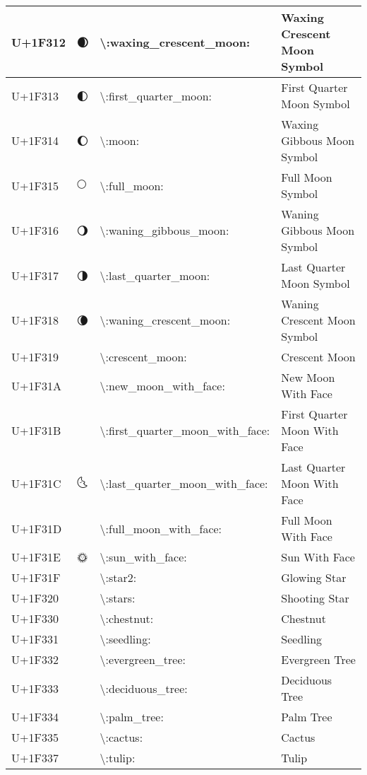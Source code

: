 \begin{table}[h]
\begin{tabulary}{\linewidth}{|L|L|L|L|}
\hline
U+1F312 & 🌒 & {\textbackslash}:waxing\_crescent\_moon: & Waxing Crescent Moon Symbol \\
\hline
U+1F313 & 🌓 & {\textbackslash}:first\_quarter\_moon: & First Quarter Moon Symbol \\
\hline
U+1F314 & 🌔 & {\textbackslash}:moon: & Waxing Gibbous Moon Symbol \\
\hline
U+1F315 & 🌕 & {\textbackslash}:full\_moon: & Full Moon Symbol \\
\hline
U+1F316 & 🌖 & {\textbackslash}:waning\_gibbous\_moon: & Waning Gibbous Moon Symbol \\
\hline
U+1F317 & 🌗 & {\textbackslash}:last\_quarter\_moon: & Last Quarter Moon Symbol \\
\hline
U+1F318 & 🌘 & {\textbackslash}:waning\_crescent\_moon: & Waning Crescent Moon Symbol \\
\hline
U+1F319 & 🌙 & {\textbackslash}:crescent\_moon: & Crescent Moon \\
\hline
U+1F31A & 🌚 & {\textbackslash}:new\_moon\_with\_face: & New Moon With Face \\
\hline
U+1F31B & 🌛 & {\textbackslash}:first\_quarter\_moon\_with\_face: & First Quarter Moon With Face \\
\hline
U+1F31C & 🌜 & {\textbackslash}:last\_quarter\_moon\_with\_face: & Last Quarter Moon With Face \\
\hline
U+1F31D & 🌝 & {\textbackslash}:full\_moon\_with\_face: & Full Moon With Face \\
\hline
U+1F31E & 🌞 & {\textbackslash}:sun\_with\_face: & Sun With Face \\
\hline
U+1F31F & 🌟 & {\textbackslash}:star2: & Glowing Star \\
\hline
U+1F320 & 🌠 & {\textbackslash}:stars: & Shooting Star \\
\hline
U+1F330 & 🌰 & {\textbackslash}:chestnut: & Chestnut \\
\hline
U+1F331 & 🌱 & {\textbackslash}:seedling: & Seedling \\
\hline
U+1F332 & 🌲 & {\textbackslash}:evergreen\_tree: & Evergreen Tree \\
\hline
U+1F333 & 🌳 & {\textbackslash}:deciduous\_tree: & Deciduous Tree \\
\hline
U+1F334 & 🌴 & {\textbackslash}:palm\_tree: & Palm Tree \\
\hline
U+1F335 & 🌵 & {\textbackslash}:cactus: & Cactus \\
\hline
U+1F337 & 🌷 & {\textbackslash}:tulip: & Tulip \\

\end{tabulary}
\end{table}
